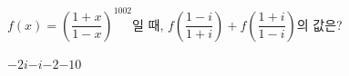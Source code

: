 $f(x)=\left(\dfrac{1+x}{1-x}\right)^{1002}$일 때, $f\left(\dfrac{1-i}{1+i}\right)+f\left(\dfrac{1+i}{1-i}\right)$의 값은?
\begin{choices32}{$-2i$}{$-i$}{$-2$}{$-1$}{$0$}\end{choices32}
